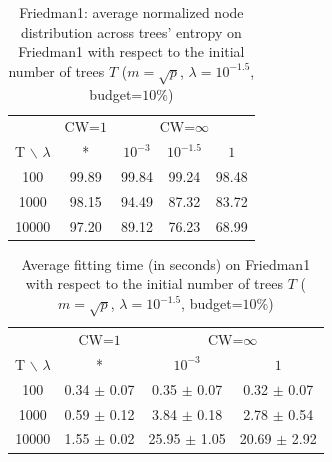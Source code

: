 \documentclass{article}
\begin{document}
\begin{table}[t]
\caption{Friedman1: average normalized node distribution across trees' entropy 
on Friedman1 
with respect to the initial number of trees $T$ ($m=\sqrt{p}$, 
$\lambda=10^{-1.5}$, budget=$10\%$)}
\label{tab:poolsizeEntropy}
\vskip 0.15in
\begin{center}
\begin{small}
\begin{tabular}{c|c|ccc}
\hline
 & CW=$1$ & \multicolumn{3}{c}{CW=$\infty$} \\
T $\backslash$ $\lambda$ & * & $10^{-3}$ & $10^{-1.5}$ & $1$ \\
\hline
100 & 99.89 & 99.84 & 99.24 & 98.48 \\
1000 & 98.15 & 94.49 & 87.32 & 83.72 \\
10000 & 97.20 & 89.12 & 76.23 & 68.99 \\
\hline
\end{tabular}
\end{small}
\end{center}
\vskip -0.1in
\end{table}

\begin{table}[t]
\caption{Average fitting time (in seconds) on Friedman1 with respect to the 
initial number of trees $T$ ($m=\sqrt{p}$, $\lambda=10^{-1.5}$, budget=$10\%$)}
\label{tab:poolsizeTime}
\vskip 0.15in
\begin{center}
\begin{small}
\begin{tabular}{c|c|cc}
\hline
 & CW=$1$ & \multicolumn{2}{c}{CW=$\infty$} \\
T $\backslash$ $\lambda$ & * & $10^{-3}$ &  $1$ \\
\hline
100 & 0.34 $\pm$ 0.07 & 0.35 $\pm$ 0.07 &  0.32 $\pm$ 0.07 \\
1000 & 0.59 $\pm$ 0.12 & 3.84 $\pm$ 0.18 & 2.78 $\pm$ 0.54 \\
10000 & 1.55 $\pm$ 0.02 & 25.95 $\pm$ 1.05 & 20.69 $\pm$ 
2.92 \\
\hline
\end{tabular}
\end{small}
\end{center}
\vskip -0.1in
\end{table}
\end{document}
